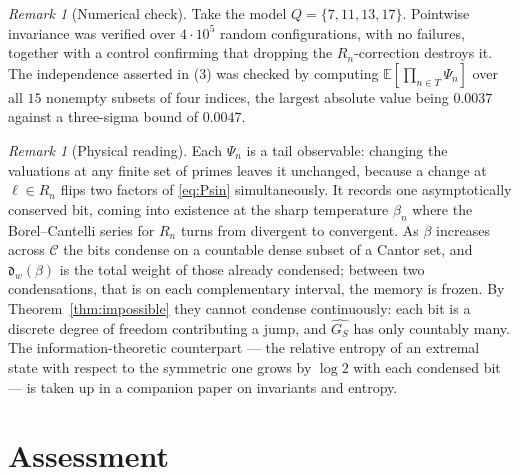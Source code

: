 \documentclass[11pt]{amsart}
\numberwithin{equation}{section}
\theoremstyle{definition}
\theoremstyle{remark}
\newtheorem{remark}[theorem]{Remark}
\newcommand{\cC}{\mathcal{C}}
\newcommand{\dw}{\mathfrak{d}}
\begin{document}
\begin{remark}[Numerical check]\label{rem:numpsi}
Take the model $Q=\{7,11,13,17\}$. Pointwise invariance was verified over
$4\cdot10^{5}$ random configurations, with no failures, together with a control
confirming that dropping the $R_n$-correction destroys it. The independence
asserted in (3) was checked by computing
$\mathbb E[\prod_{n\in T}\Psi_n]$ over all $15$ nonempty subsets of four indices, the largest
absolute value being $0.0037$ against a three-sigma bound of $0.0047$.
\end{remark}

\begin{remark}[Physical reading]\label{rem:memory}
Each $\Psi_n$ is a tail observable: changing the valuations at any finite set of primes
leaves it unchanged, because a change at $\ell\in R_n$ flips two factors of \eqref{eq:Psin}
simultaneously. It records one asymptotically conserved bit, coming into existence at the
sharp temperature $\beta_n$ where the Borel--Cantelli series for $R_n$ turns from divergent
to convergent. As $\beta$ increases across $\cC$ the bits condense on a countable dense
subset of a Cantor set, and $\dw_w(\beta)$ is the total weight of those already condensed;
between two condensations, that is on each complementary interval, the memory is frozen. By
Theorem~\ref{thm:impossible} they cannot condense continuously: each bit is a discrete
degree of freedom contributing a jump, and $\widehat{G_S}$ has only countably many. The
information-theoretic counterpart --- the relative entropy of an extremal state with respect
to the symmetric one grows by $\log2$ with each condensed bit --- is taken up in a companion
paper on invariants and entropy.
\end{remark}

\section{Assessment}
\end{document}
